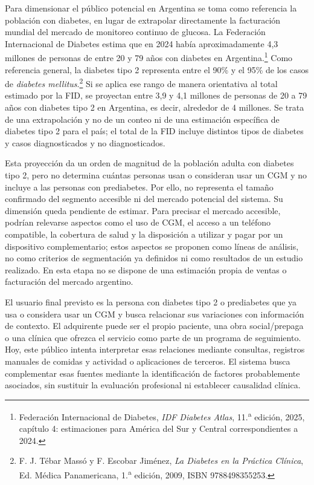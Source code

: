 Para dimensionar el público potencial en Argentina se toma como referencia la población con diabetes, en lugar de extrapolar directamente la facturación mundial del mercado de monitoreo continuo de glucosa. La Federación Internacional de Diabetes estima que en 2024 había aproximadamente 4,3 millones de personas de entre 20 y 79 años con diabetes en Argentina.\footnote{Federación Internacional de Diabetes, \textit{IDF Diabetes Atlas}, 11.\textsuperscript{a} edición, 2025, capítulo 4: estimaciones para América del Sur y Central correspondientes a 2024.} Como referencia general, la diabetes tipo 2 representa entre el 90\% y el 95\% de los casos de \textit{diabetes mellitus}.\footnote{F. J. Tébar Massó y F. Escobar Jiménez, \textit{La Diabetes en la Práctica Clínica}, Ed. Médica Panamericana, 1.\textsuperscript{a} edición, 2009, ISBN 9788498355253.} Si se aplica ese rango de manera orientativa al total estimado por la FID, se proyectan entre 3,9 y 4,1 millones de personas de 20 a 79 años con diabetes tipo 2 en Argentina, es decir, alrededor de 4 millones. Se trata de una extrapolación y no de un conteo ni de una estimación específica de diabetes tipo 2 para el país; el total de la FID incluye distintos tipos de diabetes y casos diagnosticados y no diagnosticados.

Esta proyección da un orden de magnitud de la población adulta con diabetes tipo 2, pero no determina cuántas personas usan o consideran usar un CGM y no incluye a las personas con prediabetes. Por ello, no representa el tamaño confirmado del segmento accesible ni del mercado potencial del sistema. Su dimensión queda pendiente de estimar. Para precisar el mercado accesible, podrían relevarse aspectos como el uso de CGM, el acceso a un teléfono compatible, la cobertura de salud y la disposición a utilizar y pagar por un dispositivo complementario; estos aspectos se proponen como líneas de análisis, no como criterios de segmentación ya definidos ni como resultados de un estudio realizado. En esta etapa no se dispone de una estimación propia de ventas o facturación del mercado argentino.

El usuario final previsto es la persona con diabetes tipo 2 o prediabetes que ya usa o considera usar un CGM y busca relacionar sus variaciones con información de contexto. El adquirente puede ser el propio paciente, una obra social/prepaga o una clínica que ofrezca el servicio como parte de un programa de seguimiento. Hoy, este público intenta interpretar esas relaciones mediante consultas, registros manuales de comidas y actividad o aplicaciones de terceros. El sistema busca complementar esas fuentes mediante la identificación de factores probablemente asociados, sin sustituir la evaluación profesional ni establecer causalidad clínica.

